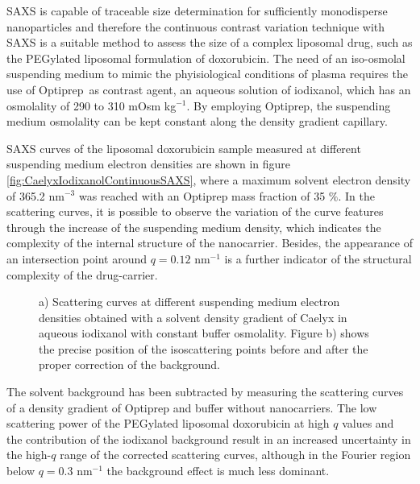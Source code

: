 SAXS is capable of traceable size determination for sufficiently monodisperse nanoparticles \citep{meli_traceable_2012} and therefore the continuous contrast variation technique with SAXS is a suitable method to assess the size of a complex liposomal drug, such as the PEGylated liposomal formulation of doxorubicin. The need of an iso-osmolal suspending medium to mimic the phyisiological conditions of plasma requires the use of Optiprep\textregistered\ as contrast agent, an aqueous solution of iodixanol, which has an osmolality of 290 to 310 mOsm kg$^{-1}$. By employing Optiprep, the suspending medium osmolality can be kept constant along the density gradient capillary.
 
SAXS curves of the liposomal doxorubicin sample measured at different suspending medium electron densities are shown in figure \ref{fig:CaelyxIodixanolContinuousSAXS}, where a maximum solvent electron density of 365.2 nm$^{-3}$ was reached with an Optiprep mass fraction of 35 $\%$. In the scattering curves, it is possible to observe the variation of the curve features through the increase of the suspending medium density, which indicates the complexity of the internal structure of the nanocarrier. Besides, the appearance of an intersection point around $q = 0.12$ nm$^{-1}$ is a further indicator of the structural complexity of the drug-carrier.

\begin{figure}
	\centering
		\caption[Continuous contrast variation experimental data of Caelyx.]{ a) Scattering curves at different suspending medium electron densities obtained with a solvent density gradient of Caelyx in aqueous iodixanol with constant buffer osmolality. Figure b) shows the precise position of the isoscattering points before and after the proper correction of the background.}
\end{figure}

The solvent background has been subtracted by measuring the scattering curves of a density gradient of Optiprep and buffer without nanocarriers. The low scattering power of the PEGylated liposomal doxorubicin at high $q$ values and the contribution of the iodixanol background result in an increased uncertainty in the high-$q$ range of the corrected scattering curves, although in the Fourier region below $q = 0.3$ nm$^{-1}$ the background effect is much less dominant.

